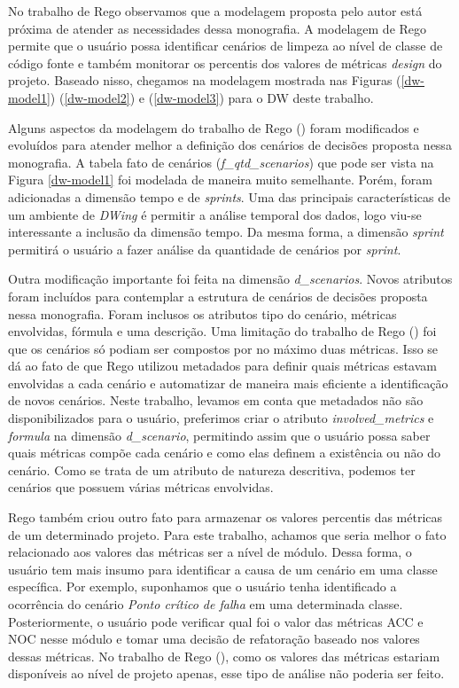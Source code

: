 No trabalho de Rego \citeyear{rego2014} observamos que a modelagem proposta pelo autor está próxima de atender as necessidades dessa monografia. A modelagem de Rego \citeyear{rego2014} permite que o usuário possa identificar cenários de limpeza ao nível de classe de código fonte e também monitorar os percentis dos valores de métricas \emph{design} do projeto. Baseado nisso, chegamos na modelagem mostrada nas Figuras (\ref{dw-model1}) (\ref{dw-model2}) e (\ref{dw-model3}) para o DW deste trabalho.

Alguns aspectos da modelagem do trabalho de Rego (\citeyear{rego2014}) foram modificados e evoluídos para atender melhor a definição dos cenários de decisões proposta nessa monografia. A tabela fato de cenários (\emph{f\_qtd\_scenarios}) que pode ser vista na Figura \ref{dw-model1}  foi modelada de maneira muito semelhante. Porém, foram adicionadas a dimensão tempo e de \emph{sprints}. Uma das principais características de um ambiente de \emph{DWing} é permitir a análise temporal dos dados, logo viu-se interessante a inclusão da dimensão tempo. Da mesma forma, a dimensão \emph{sprint} permitirá o usuário a fazer análise da quantidade de cenários por \emph{sprint}. 

Outra modificação importante foi feita na dimensão \emph{d\_scenarios}. Novos atributos foram incluídos para contemplar a estrutura de cenários de decisões proposta nessa monografia. Foram inclusos os atributos tipo do cenário, métricas envolvidas, fórmula e uma descrição. Uma limitação do trabalho de Rego (\citeyear{rego2014}) foi que os cenários só podiam ser compostos por no máximo duas métricas. Isso se dá ao fato de que Rego utilizou  metadados para definir quais métricas estavam envolvidas a cada cenário e automatizar de maneira mais eficiente a identificação de novos cenários. Neste trabalho, levamos em conta que  metadados não são disponibilizados para o usuário, preferimos criar o atributo \emph{involved\_metrics} e \emph{formula} na dimensão \emph{d\_scenario}, permitindo assim que o usuário possa saber quais métricas compõe cada cenário e como elas definem a existência ou não do cenário. Como se trata de um atributo de natureza descritiva, podemos ter cenários que possuem várias métricas envolvidas.

Rego também criou outro fato para armazenar os valores percentis das métricas de um determinado projeto. Para este trabalho, achamos que seria melhor o fato relacionado aos valores das métricas ser a nível de módulo. Dessa forma, o usuário tem mais insumo para identificar a causa de um cenário em uma classe específica. Por exemplo, suponhamos que o usuário tenha identificado a ocorrência do cenário \emph{Ponto crítico de falha} em uma determinada classe. Posteriormente, o usuário pode verificar qual foi o valor das métricas ACC e NOC nesse módulo e tomar uma decisão de refatoração baseado nos valores dessas métricas. No trabalho de Rego (\citeyear{rego2014}), como os valores das métricas estariam disponíveis ao nível de projeto apenas, esse tipo de análise não poderia ser feito.

